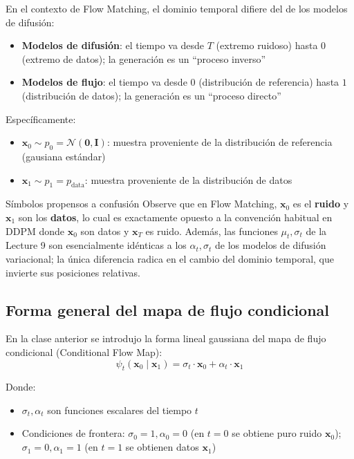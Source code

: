 \documentclass[a4paper]{article}
\begin{document}
En el contexto de Flow Matching, el dominio temporal difiere del de los modelos de difusión:

\begin{itemize}
    \item \textbf{Modelos de difusión}: el tiempo va desde $T$ (extremo ruidoso) hasta $0$ (extremo de datos); la generación es un ``proceso inverso''
    \item \textbf{Modelos de flujo}: el tiempo va desde $0$ (distribución de referencia) hasta $1$ (distribución de datos); la generación es un ``proceso directo''
\end{itemize}

Específicamente:
\begin{itemize}
    \item $\mathbf{x}_0 \sim p_0 = \mathcal{N}(\mathbf{0}, \mathbf{I})$: muestra proveniente de la distribución de referencia (gausiana estándar)
    \item $\mathbf{x}_1 \sim p_1 = p_{\text{data}}$: muestra proveniente de la distribución de datos
\end{itemize}

\begin{warningbox}{Símbolos propensos a confusión}
Observe que en Flow Matching, $\mathbf{x}_0$ es el \textbf{ruido} y $\mathbf{x}_1$ son los \textbf{datos}, lo cual es exactamente opuesto a la convención habitual en DDPM donde $\mathbf{x}_0$ son datos y $\mathbf{x}_T$ es ruido. Además, las funciones $\mu_t, \sigma_t$ de la Lecture 9 son esencialmente idénticas a los $\alpha_t, \sigma_t$ de los modelos de difusión variacional; la única diferencia radica en el cambio del dominio temporal, que invierte sus posiciones relativas.
\end{warningbox}

\subsection{Forma general del mapa de flujo condicional}

En la clase anterior se introdujo la forma lineal gaussiana del mapa de flujo condicional (Conditional Flow Map):
$$\psi_t(\mathbf{x}_0 \mid \mathbf{x}_1) = \sigma_t \cdot \mathbf{x}_0 + \alpha_t \cdot \mathbf{x}_1$$

Donde:
\begin{itemize}
    \item $\sigma_t, \alpha_t$ son funciones escalares del tiempo $t$
    \item Condiciones de frontera: $\sigma_0 = 1, \alpha_0 = 0$ (en $t=0$ se obtiene puro ruido $\mathbf{x}_0$); $\sigma_1 = 0, \alpha_1 = 1$ (en $t=1$ se obtienen datos $\mathbf{x}_1$)
\end{itemize}
\end{document}
